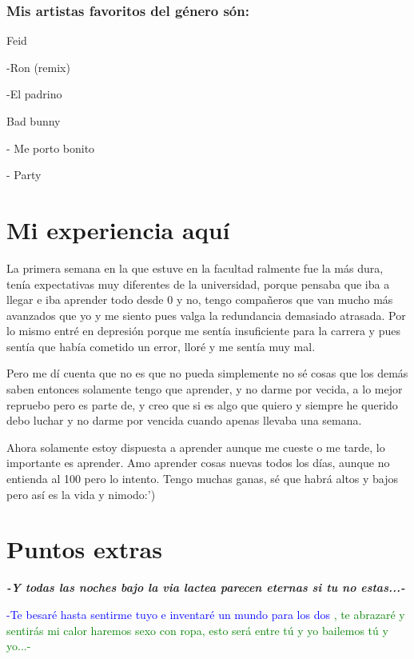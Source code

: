 \documentclass[12pt]{article}
\begin{document}
\subsubsection{Mis artistas favoritos del género són:}

Feid

-Ron (remix)

-El padrino

Bad bunny %

- Me porto bonito

- Party

\section{Mi experiencia aquí}
La primera semana en la que estuve en la facultad ralmente fue la más dura, tenía expectativas muy diferentes de la universidad, porque pensaba que iba a llegar e iba aprender todo desde 0 y no, tengo compañeros que van mucho más avanzados que yo y me siento pues valga la redundancia demasiado atrasada. Por lo mismo entré en depresión porque me sentía insuficiente para la carrera y pues sentía que había cometido un error, lloré y me sentía muy mal. 



Pero me dí cuenta que no es que no pueda simplemente no sé cosas que los demás saben entonces solamente tengo que aprender, y no darme por vecida, a lo mejor repruebo pero es parte de, y creo que si es algo que quiero y siempre he querido debo luchar y no darme por vencida cuando apenas llevaba una semana. 



Ahora solamente estoy dispuesta a aprender aunque me cueste o me tarde, lo importante es aprender. Amo aprender cosas nuevas todos los días, aunque no entienda al 100 pero lo intento. Tengo muchas ganas, sé que habrá altos y bajos pero así es la vida y nimodo:')

\section{Puntos extras}
\textit

\textbf{-Y todas las noches bajo la via lactea parecen eternas si tu no estas...-}


\textcolor{blue}{-Te besaré hasta sentirme tuyo e inventaré un mundo para los dos}
\textcolor{green}{, te abrazaré y sentirás mi calor haremos sexo con ropa, esto será entre tú y yo bailemos tú y yo...-}
\end{document}
